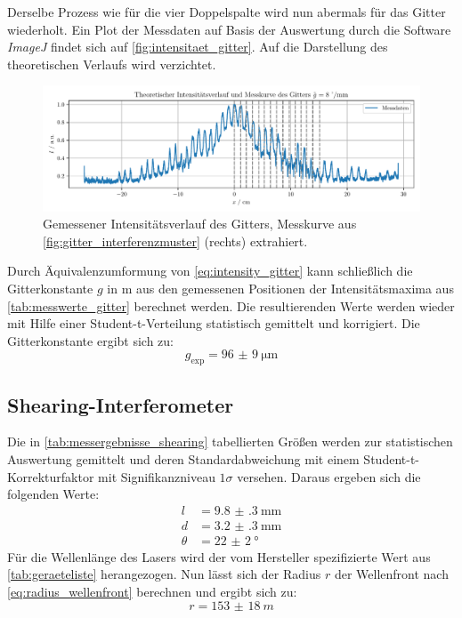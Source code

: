 \documentclass[ngerman]{scrartcl}
\begin{document}
Derselbe Prozess wie für die vier Doppelspalte wird nun abermals für das Gitter wiederholt. Ein Plot der Messdaten auf Basis der Auswertung durch die Software \textit{ImageJ} findet sich auf \autoref{fig:intensitaet_gitter}. Auf die Darstellung des theoretischen Verlaufs wird verzichtet.
%
\begin{figure}[H]
    \centering
    \begin{samepage}
        \includegraphics[width=\linewidth]{../python/plots/grating.pdf}
        \caption[Intensitätskurve Gitter]{Gemessener Intensitätsverlauf des Gitters, Messkurve aus \autoref{fig:gitter_interferenzmuster} (rechts) extrahiert.}
        \label{fig:intensitaet_gitter}
    \end{samepage}
\end{figure}
%
Durch Äquivalenzumformung von \autoref{eq:intensity_gitter} kann schließlich die Gitterkonstante $g$ in \si{m} aus den gemessenen Positionen der Intensitätsmaxima aus \autoref{tab:messwerte_gitter} berechnet werden. Die resultierenden Werte werden wieder mit Hilfe einer Student-t-Verteilung statistisch gemittelt und korrigiert. Die Gitterkonstante ergibt sich zu:
\[g_{\text{exp}} = \SI{96(9)}{\micro\meter}\]


\subsection{Shearing-Interferometer}
\label{subsec:auswertung_shearing}

Die in \autoref{tab:messergebnisse_shearing} tabellierten Größen werden zur statistischen Auswertung gemittelt und deren Standardabweichung mit einem Student-t-Korrekturfaktor mit Signifikanzniveau $1\sigma$ versehen. Daraus ergeben sich die folgenden Werte:
\begin{align*}
    l      & = \SI{9.8(3)}{\milli\meter} \\
    d      & = \SI{3.2(3)}{\milli\meter} \\
    \theta & = \SI{22(2)}{\degree}
\end{align*}
Für die Wellenlänge des Lasers wird der vom Hersteller spezifizierte Wert aus \autoref{tab:geraeteliste} herangezogen. Nun lässt sich der Radius $r$ der Wellenfront nach \autoref{eq:radius_wellenfront} berechnen und ergibt sich zu:
\[r=\SI{153(18)}{m}\]
\end{document}
